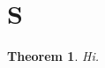 \documentclass{article}
\newtheorem{theorem}{Theorem}[section]
\begin{document}
\section{S}
\begin{theorem}\label{t:x}Hi.\end{theorem}
\end{document}
